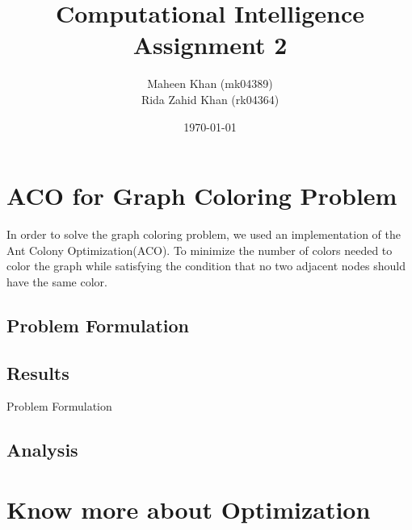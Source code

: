 \documentclass[a4paper]{article}
\begin{document}
\newcommand{\shellcmd}[1]{\\\indent\indent\texttt{\footnotesize\# #1}\\}

\title{Computational Intelligence \\ Assignment 2}
\author{Maheen Khan (mk04389) \\ Rida Zahid Khan (rk04364)}
\date{\today}
\maketitle
\section{ACO for Graph Coloring Problem}
\par In order to solve the graph coloring problem, we used an implementation of the Ant Colony Optimization(ACO).
To minimize the number of colors needed to color the graph while satisfying the condition that no two adjacent nodes should have the same color.
\subsection{Problem Formulation}
\par 
\subsection{Results}
Problem Formulation
\subsection{Analysis}
\section{Know more about Optimization}
\end{document}
